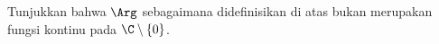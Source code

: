 
\begin{exbox}
\begin{exercise}
Tunjukkan bahwa $\Arg$ sebagaimana didefinisikan di atas bukan merupakan fungsi kontinu pada
$\C \setminus \{ 0 \}$.
\end{exercise}
\end{exbox}
